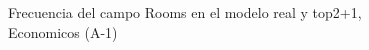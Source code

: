 \begin{figure}[H]
    \centering
    
    \caption{Frecuencia del campo Rooms en el modelo real y top2+1, Economicos (A-1)}
    \label{frecuency-Rooms-top2+1}
\end{figure}